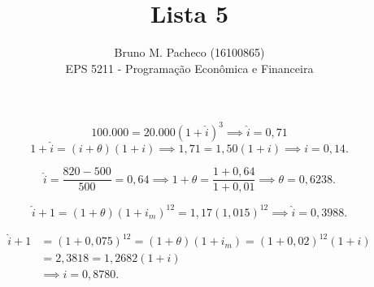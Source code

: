 \documentclass[a4paper]{report}
\begin{document}
 
\title{Lista 5}
\author{Bruno M. Pacheco (16100865)\\
EPS 5211 - Programação Econômica e Financeira}
 
\maketitle
 

\[
100.000 = 20.000 \left( 1 + \hat{i} \right) ^{3} \implies \hat{i} = 0,71
\] \[
1 + \hat{i} = (i +\theta)(1 + i) \implies 1,71 = 1,50 \left( 1 + i \right) \implies i = 0,14
.\] 


\[
\hat{i} = \frac{820 - 500}{500} = 0,64 \implies 1 + \theta = \frac{1 + 0,64}{1 + 0,01} \implies \theta = 0,6238
.\] 


\[
\hat{i} + 1 = \left( 1 + \theta \right) \left( 1 + i_m \right)^{12} = 1,17 \left(1,015  \right) ^{12} \implies \hat{i} = 0,3988
.\] 


\begin{align*}
    \hat{i} + 1 &= \left( 1 + 0,075 \right)^{12} = \left( 1 + \theta \right) \left( 1 + i_m \right) = \left( 1 + 0,02 \right) ^{12} \left(1 + i  \right)  \\
    &= 2,3818 = 1,2682 \left( 1 + i \right)  \\
    &\implies i = 0,8780
.\end{align*}
\end{document}
